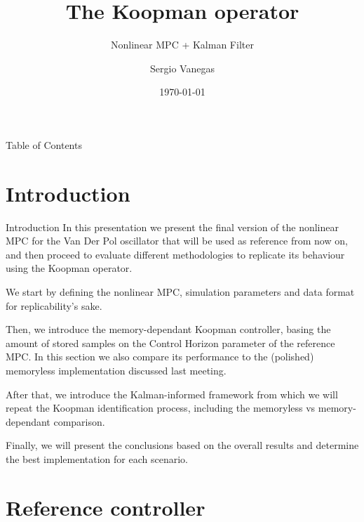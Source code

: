 \documentclass{beamer}
\title[Process]{The Koopman operator}
\subtitle{Nonlinear MPC + Kalman Filter}
\institute[Polimi]{Politecnico di Milano}
\author{Sergio Vanegas}
\date{\today}
\begin{document}
\begin{frame}
    \maketitle
\end{frame}

\begin{frame}{Table of Contents}
    \tableofcontents
\end{frame}


\section{Introduction}

\begin{frame}{Introduction}
    In this presentation we present the final version of the nonlinear MPC for the Van Der Pol oscillator that will be used as reference from now on, and then proceed to evaluate different methodologies to replicate its behaviour using the Koopman operator.

    We start by defining the nonlinear MPC, simulation parameters and data format for replicability's sake.

    Then, we introduce the memory-dependant Koopman controller, basing the amount of stored samples on the Control Horizon parameter of the reference MPC. In this section we also compare its performance to the (polished) memoryless implementation discussed last meeting.

    After that, we introduce the Kalman-informed framework from which we will repeat the Koopman identification process, including the memoryless vs memory-dependant comparison.

    Finally, we will present the conclusions based on the overall results and determine the best implementation for each scenario.
\end{frame}


\section{Reference controller}
\end{document}
